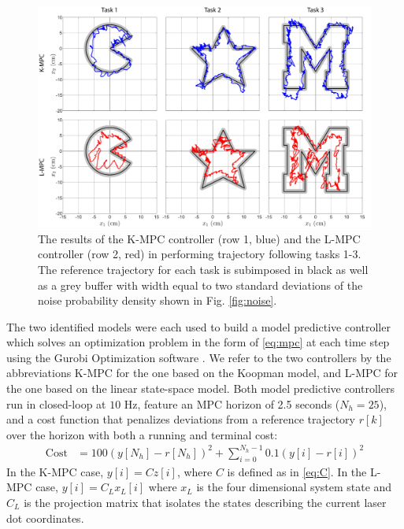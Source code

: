 \begin{figure}
    \centering
    \includegraphics[width=\linewidth]{figures/results_M_edited.pdf}
    \caption{The results of the K-MPC controller (row 1, blue) and the L-MPC controller (row 2, red) in performing trajectory following tasks 1-3. The reference trajectory for each task is subimposed in black as well as a grey buffer with width equal to two standard deviations of the noise probability density shown in Fig. \ref{fig:noise}.}
    \label{fig:results}
\end{figure}


The two identified models were each used to build a model predictive controller which solves an optimization problem in the form of \eqref{eq:mpc} at each time step using the Gurobi Optimization software \cite{gurobi}.
We refer to the two controllers by the abbreviations K-MPC for the one based on the Koopman model, and L-MPC for the one based on the linear state-space model. 
Both model predictive controllers run in closed-loop at $10$ Hz, feature an MPC horizon of 2.5 seconds ($N_h = 25$), and a cost function that penalizes deviations from a reference trajectory $r[k]$ over the horizon with both a running and terminal cost:
\begin{align}
    \text{Cost} &= 100 \left( y[N_h] - r[N_h] \right)^2 + \sum_{i=0}^{N_h - 1} 0.1 \left( y[i] - r[i] \right)^2
\end{align}
In the K-MPC case, $y[i] = C z[i]$, where $C$ is defined as in \eqref{eq:C}.
In the L-MPC case, $y[i] = C_L x_L[i]$ where $x_L$ is the four dimensional system state and $C_L$ is the projection matrix that isolates the states describing the current laser dot coordinates. 

